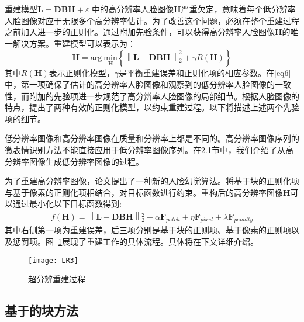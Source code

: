 重建模型$\mathbf{L=DBH}+\varepsilon$ 中的高分辨率人脸图像$\mathbf{H}$严重欠定，意味着每个低分辨率人脸图像对应于无限多个高分辨率估计。为了改善这个问题，必须在整个重建过程之前加入进一步的正则化。通过附加先验条件，可以获得高分辨率人脸图像$\mathbf{H}$的唯一解决方案。重建模型可以表示为：
\begin{equation}
    \label{eq6}
    \mathbf{H} = \mathrm{arg}~\underset{\mathbf{H}}{\mathrm{min}}\left \{ \left \| \mathbf{L-DBH} \right \| _{2}^{2}+\gamma R(\mathbf{H}) \right \}
\end{equation}
其中$R(\mathbf{H})$表示正则化模型，$\gamma$是平衡重建误差和正则化项的相应参数。在\ref{eq6}中，第一项确保了估计的高分辨率人脸图像和观察到的低分辨率人脸图像的一致性，而附加的先验项进一步规范了高分辨率人脸图像的局部细节。根据人脸图像的特点，提出了两种有效的正则化模型，以约束重建过程。以下将描述上述两个先验项的细节。

低分辨率图像和高分辨率图像在质量和分辨率上都是不同的。高分辨率图像序列的微表情识别方法不能直接应用于低分辨率图像序列。在2.1节中，我们介绍了从高分辨率图像生成低分辨率图像的过程。

为了重建高分辨率图像，论文提出了一种新的人脸幻觉算法。将基于块的正则化项与基于像素的正则化项相结合，对目标函数进行约束。重构后的高分辨率图像$\boldsymbol{H}$可以通过最小化以下目标函数得到:
\begin{equation}
 \label{eq7}
 \begin{split}
    f\left ( \boldsymbol{H} \right )= \left \| \boldsymbol{L}-\boldsymbol{DBH} \right \|{_{2}^{2}}+\alpha \boldsymbol{F}_{patch}+\eta \boldsymbol{F}_{pixel}+\lambda \boldsymbol{F}_{penalty}
 \end{split}
\end{equation}
其中右侧第一项为重建误差，后三项分别是基于块的正则项、基于像素的正则项以及惩罚项。图~\ref{fig15}展现了重建工作的具体流程。具体将在下文详细介绍。

\begin{figure}[!htbp]
\centering
\texttt{[image: LR3]}
\caption{超分辨重建过程}
\label{fig15}
\end{figure}

\subsection{基于的块方法}


